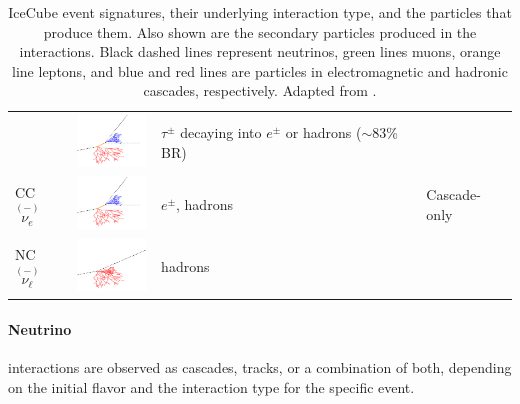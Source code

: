 \begin{table}[h]
\begin{center}
\begin{tabular}{ m{1.8cm} m{2.0cm} m{3.0cm} m{1.8cm} }
            & \includegraphics[width=2cm]{figures/neutrinos_properties/interaction_schematics/nutau_CC_cascadeonly.pdf}
            & $\tau^\pm$ decaying into $e^\pm$ or hadrons ($\sim$83\% BR)  
            & {} \\

            \cmidrule{1-3} CC $\overset{(-)}{\nu_e}$ 
            & \includegraphics[width=2cm]{figures/neutrinos_properties/interaction_schematics/nue_CC_cascadeonly.pdf}
            & $e^\pm$, hadrons & {Cascade-only} \\

            \cmidrule{1-3}

            NC $\overset{(-)}{\nu_\ell}$ 
            & \includegraphics[width=2cm]{figures/neutrinos_properties/interaction_schematics/nuall_NC_cascadeonly.pdf} 
            & hadrons &  {} \\

            \hline
        \end{tabular}
    \end{center}
    \caption[IceCube event signatures and underlying interactions]{IceCube event signatures, their underlying interaction type, and the particles that produce them. Also shown are the secondary particles produced in the interactions. Black dashed lines represent neutrinos, green lines muons, orange line leptons, and blue and red lines are particles in electromagnetic and hadronic cascades, respectively. Adapted from \cite{ATerliuk}.}
\end{table}


\paragraph{Neutrino} interactions are observed as cascades, tracks, or a combination of both, depending on the initial flavor and the interaction type for the specific event.

